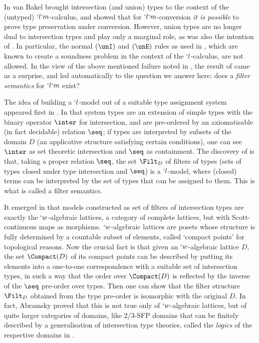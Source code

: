 \documentclass{lmcs}
\begin{document}
In \cite{Bakel-ITRS'10} van Bakel brought intersection (and union) types to the context of the (untyped) $`l`m$-calculus, and showed that for $`l`m$-conversion \emph{it is possible} to prove type preservation under conversion.
However, union types are no longer dual to intersection types and play only a marginal role, as was also the intention of \cite{DGL-CDR'08}.
In particular, the normal $(\unI)$ and $(\unE)$ rules as used in \cite{Barbanera-Dezani-Liguoro-IaC'95}, which are known to create a soundness problem in the context of the $`l$-calculus, are not allowed.
In the view of the above mentioned failure noted in \cite{Bakel-APAL'10}, the result of \cite{Bakel-ITRS'10} came as a surprise, and led automatically to the question we answer here: does a \emph{filter semantics} for $`l`m$ exist?

The idea of building a $`l$-model out of a suitable type assignment system appeared first in \cite{BCD'83}. In that system types are an extension of simple types with the binary operator $\inter$ for intersection, and are pre-ordered by an axiomatisable (in fact decidable) relation $\seq$; if types are interpreted by subsets of the domain $D$ (an applicative structure satisfying certain conditions), one can see $\inter$ as set theoretic intersection and $\seq$ as containment. The discovery of \cite{BCD'83} is that, taking a proper relation $\seq$, the set $\Filt_D$ of filters of types (sets of types closed under type intersection and $\seq$) is a $`l$-model, where (closed) terms can be interpreted by the set of types that can be assigned to them. This is what is called a filter semantics.

It emerged in \cite{Coppo-et.al'84} that models constructed as set of filters of intersection types are exactly the $`w$-algebraic lattices, a category of complete lattices, but with Scott-continuous maps as morphisms. 
$`w$-algebraic lattices are posets whose structure is fully determined by a countable subset of elements, called `compact points' for topological reasons.
Now the crucial fact is that given an $`w$-algebraic lattice $D$, the set $\Compact(D)$ of its compact points can be described by putting its elements into a one-to-one correspondence with a suitable set of intersection types, in such a way that the order over $\Compact(D)$ is reflected by the inverse of the $\seq$ pre-order over types. 
Then one can show that the filter structure $\Filt_D$ obtained from the type pre-order is isomorphic with the original $D$. 
In fact, Abramsky proved that this is not true only of $`w$-algebraic lattices, but of quite
larger categories of domains, like $2/3$-SFP domains that can be finitely described by a generalisation of intersection type theories, called the \emph{logics} of the respective domains in \cite{Abramsky'91}.
\end{document}
